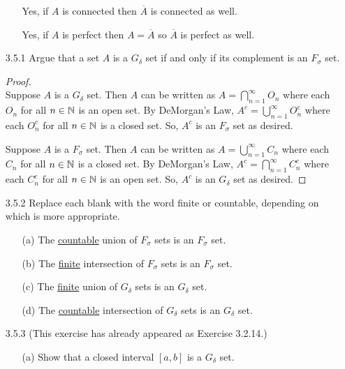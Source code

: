 \documentclass[12pt,letterpaper]{article}
\begin{document}
\begin{itemize}[leftmargin=!,labelindent=5pt]
\begin{itemize}
                    Yes, if $A$ is connected then $\overline{A}$ is connected as well.

                    Yes, if $A$ is perfect then $A = \overline{A}$ so $\overline{A}$ is perfect as well.
            \end{itemize}
        \newpage
        \item [3.5.1] Argue that a set $A$ is a $G_\delta$ set if and only if its complement is an $F_\sigma$ set.
            \begin{proof}
                \ \\
                Suppose $A$ is a $G_\delta$ set.
                Then $A$ can be written as $A = \bigcap_{n=1}^{\infty} O_n$ where each $O_n$ for all $n \in \mathbb{N}$ is an open set.
                By DeMorgan's Law, $A^c = \bigcup_{n=1}^{\infty} O_n^c$ where each $O_n^c$ for all $n \in \mathbb{N}$ is a closed set.
                So, $A^c$ is an $F_\sigma$ set as desired.

                Suppose $A$ is a $F_\sigma$ set.
                Then $A$ can be written as $A = \bigcup_{n=1}^{\infty} C_n$ where each $C_n$ for all $n \in \mathbb{N}$ is a closed set.
                By DeMorgan's Law, $A^c = \bigcap_{n=1}^{\infty} C_n^c$ where each $C_n^c$ for all $n \in \mathbb{N}$ is an open set.
                So, $A^c$ is an $G_\delta$ set as desired.
            \end{proof}
        \item [3.5.2] Replace each blank with the word finite or countable, depending on which is more appropriate.
            \begin{itemize}
                \item [(a)] The \underline{countable} union of $F_\sigma$ sets is an $F_\sigma$ set.
                \item [(b)] The \underline{finite} intersection of $F_\sigma$ sets is an $F_\sigma$ set.
                \item [(c)] The \underline{finite} union of $G_\delta$ sets is an $G_\delta$ set.
                \item [(d)] The \underline{countable} intersection of $G_\delta$ sets is an $G_\delta$ set.
            \end{itemize}
        \item [3.5.3] (This exercise has already appeared as Exercise 3.2.14.)
            \begin{itemize}
                \item [(a)] Show that a closed interval $[a, b]$ is a $G_\delta$ set.
                

\end{itemize}
\end{itemize}
\end{document}
